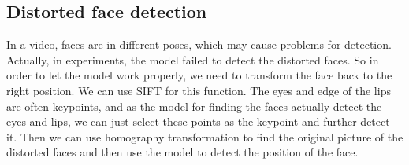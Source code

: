 \subsection{Distorted face detection}
In a video, faces are in different poses, which may cause problems for detection. Actually, in experiments, the model failed to detect the distorted faces. So in order to let the model work properly, we need to transform the face back to the right position. We can use SIFT for this function. The eyes and edge of the lips are often keypoints, and as the model for finding the faces actually detect the eyes and lips, we can just select these points as the keypoint and further detect it. Then we can use homography transformation to find the original picture of the distorted faces and then use the model to detect the position of the face. 


